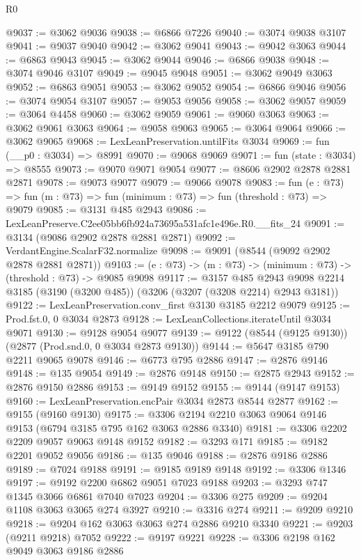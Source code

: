\begin{lexlean}{R0}
\begin{coremodule}
@9037 := @3062 @9036
@9038 := @6866 @7226
@9040 := @3074 @9038 @3107
@9041 := @9037 @9040
@9042 := @3062 @9041
@9043 := @9042 @3063
@9044 := @6863 @9043
@9045 := @3062 @9044
@9046 := @6866 @9038
@9048 := @3074 @9046 @3107
@9049 := @9045 @9048
@9051 := @3062 @9049 @3063
@9052 := @6863 @9051
@9053 := @3062 @9052
@9054 := @6866 @9046
@9056 := @3074 @9054 @3107
@9057 := @9053 @9056
@9058 := @3062 @9057
@9059 := @3064 @4458
@9060 := @3062 @9059
@9061 := @9060 @3063
@9063 := @3062 @9061 @3063
@9064 := @9058 @9063
@9065 := @3064 @9064
@9066 := @3062 @9065
@9068 := LexLeanPreservation.untilFits @3034
@9069 := fun (__p0 : @3034) => @8991
@9070 := @9068 @9069
@9071 := fun (state : @3034) => @8555
@9073 := @9070 @9071 @9054
@9077 := @8606 @2902 @2878 @2881 @2871
@9078 := @9073 @9077
@9079 := @9066 @9078
@9083 := fun (e : @73) => fun (m : @73) => fun (minimum : @73) => fun (threshold : @73) => @9079
@9085 := @3131 @485 @2943
@9086 := LexLeanPreserve.C2ee05bb6fb924a73695a531afc1e496e.R0.__fits_24
@9091 := @3134 (@9086 @2902 @2878 @2881 @2871)
@9092 := VerdantEngine.ScalarF32.normalize
@9098 := @9091 (@8544 (@9092 @2902 @2878 @2881 @2871))
@9103 := (e : @73) -> (m : @73) -> (minimum : @73) -> (threshold : @73) -> @9085 @9098
@9117 := @3157
    @485
    @2943
    @9098
    @2214
    @3185
    (@3190 (@3200 @485))
    (@3206 (@3207 (@3208 @2214) @2943 @3181))
@9122 := LexLeanPreservation.conv_first @3130 @3185 @2212 @9079
@9125 := Prod.fst.{0, 0} @3034 @2873
@9128 := LexLeanCollections.iterateUntil @3034 @9071
@9130 := @9128 @9054 @9077
@9139 := @9122 (@8544 (@9125 @9130)) (@2877 (Prod.snd.{0, 0} @3034 @2873 @9130))
@9144 := @5647 @3185 @790 @2211 @9065 @9078
@9146 := @6773 @795 @2886
@9147 := @2876 @9146
@9148 := @135 @9054
@9149 := @2876 @9148
@9150 := @2875 @2943
@9152 := @2876 @9150 @2886
@9153 := @9149 @9152
@9155 := @9144 (@9147 @9153)
@9160 := LexLeanPreservation.encPair @3034 @2873 @8544 @2877
@9162 := @9155 (@9160 @9130)
@9175 := @3306 @2194 @2210 @3063 @9064 @9146 @9153 (@6794 @3185 @795 @162 @3063 @2886 @3340)
@9181 := @3306 @2202 @2209 @9057 @9063 @9148 @9152
@9182 := @3293 @171
@9185 := @9182 @2201 @9052 @9056
@9186 := @135 @9046
@9188 := @2876 @9186 @2886
@9189 := @7024 @9188
@9191 := @9185 @9189 @9148
@9192 := @3306 @1346
@9197 := @9192 @2200 @6862 @9051 @7023 @9188
@9203 := @3293 @747 @1345 @3066 @6861 @7040 @7023
@9204 := @3306 @275
@9209 := @9204 @1108 @3063 @3065 @274 @3927
@9210 := @3316 @274
@9211 := @9209 @9210
@9218 := @9204 @162 @3063 @3063 @274 @2886 @9210 @3340
@9221 := @9203 (@9211 @9218) @7052
@9222 := @9197 @9221
@9228 := @3306 @2198 @162 @9049 @3063 @9186 @2886

\end{coremodule}
\end{lexlean}
